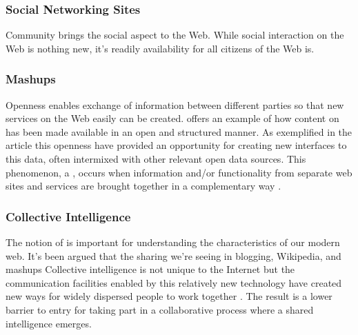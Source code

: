\subsubsection{Social Networking Sites}
Community brings the social aspect to the Web. While social
interaction on the Web is nothing new, it's readily availability for all
citizens of the Web is.

\subsubsection{Mashups}
Openness enables exchange of information between
different parties so that new services on the Web easily can be created.
\citet{auer07} offers an example of how content on %
has been made available in an open and structured manner. As exemplified
in the article this openness have provided an opportunity for creating new
interfaces to this data, often intermixed with other relevant open
data sources. This phenomenon, a %
,
occurs when information and/or functionality from separate web sites and
services are brought together in a complementary way
\citep[]{murugesan07}.

\subsubsection{Collective Intelligence}
The notion of  is important for understanding
the characteristics of our modern web. It's been argued that the sharing we're
seeing in blogging, Wikipedia, and mashups
Collective intelligence is not unique
to the Internet but the communication facilities enabled by this relatively
new technology have created new ways for widely dispersed people to work
together \citep{mitcenter08}. The result is a lower barrier to entry for
taking part in a collaborative process where a shared intelligence emerges.

